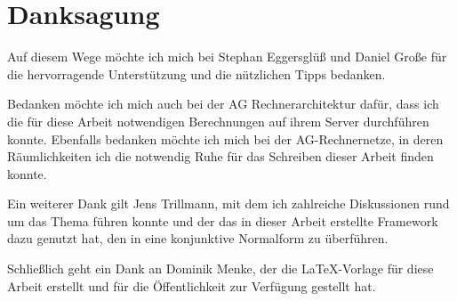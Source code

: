 \section*{Danksagung}

Auf diesem Wege möchte ich mich bei Stephan Eggersglüß und Daniel Große für die hervorragende Unterstützung und die nützlichen Tipps bedanken.

Bedanken möchte ich mich auch bei der AG Rechnerarchitektur dafür, dass ich die für diese Arbeit notwendigen Berechnungen auf ihrem Server durchführen konnte.
Ebenfalls bedanken möchte ich mich bei der AG-Rechnernetze, in deren Räumlichkeiten ich die notwendig Ruhe für das Schreiben dieser Arbeit finden konnte.

Ein weiterer Dank gilt Jens Trillmann, mit dem ich zahlreiche Diskussionen rund um das Thema führen konnte und der das in dieser Arbeit erstellte
Framework dazu genutzt hat, den  in eine konjunktive Normalform zu überführen.

Schließlich geht ein Dank an Dominik Menke, der die LaTeX-Vorlage für diese Arbeit erstellt und für die Öffentlichkeit zur Verfügung gestellt hat.